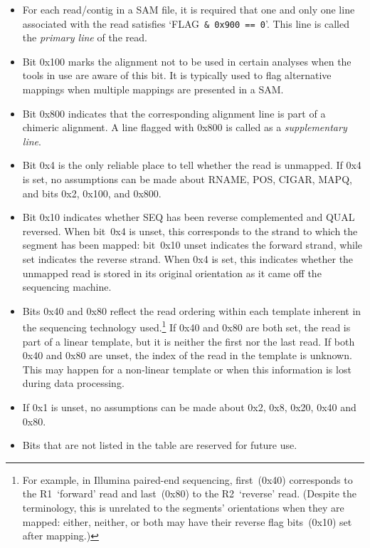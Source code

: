 \documentclass[10pt]{article}
\begin{document}
\begin{enumerate}
\begin{center}
  \end{center}
  \begin{itemize}
  \item For each read/contig in a SAM file, it is required that one and only
	one line associated with the read satisfies \mbox{`{\sf FLAG} {\tt \& 0x900
	== 0}'}. This line is called the \emph{primary line} of the read.
  \item Bit 0x100 marks the alignment not to be used in certain analyses
    when the tools in use are aware of this bit. It is typically used to
	flag alternative mappings when multiple mappings are presented in a SAM.
  \item Bit 0x800 indicates that the corresponding alignment line is part of
    a chimeric alignment. A line flagged with 0x800 is called as a \emph{supplementary line}.
  \item Bit 0x4 is the only reliable place to tell whether the read
    is unmapped. If 0x4 is set, no assumptions can be made about {\sf
      RNAME}, {\sf POS}, {\sf CIGAR}, {\sf MAPQ}, and bits 0x2, 0x100,
    and 0x800.
  \item Bit 0x10 indicates whether {\sf SEQ} has been reverse complemented
    and {\sf QUAL} reversed.
    When bit~0x4 is unset, this corresponds to the strand to which the
    segment has been mapped: bit~0x10 unset indicates the forward strand,
    while set indicates the reverse strand.
    When 0x4 is set, this indicates whether the unmapped read is stored
    in its original orientation as it came off the sequencing machine.
  \item Bits 0x40 and 0x80 reflect the read ordering within each template
    inherent in the sequencing technology used.\footnote{For example,
    in Illumina paired-end sequencing, {\sf first}~(0x40) corresponds to
    the R1~`forward' read and {\sf last}~(0x80) to the R2~`reverse' read.
    (Despite the terminology, this is unrelated to the segments' orientations
    when they are mapped: either, neither, or both may have their
    {\sf reverse} flag bits~(0x10) set after mapping.)}
    If 0x40 and 0x80 are both set, the read is part of a linear
    template, but it is neither the first nor the last read. If both
    0x40 and 0x80 are unset, the index of the read in the template
    is unknown. This may happen for a non-linear template or when this
    information is lost during data processing.
  \item If 0x1 is unset, no assumptions can be made about 0x2, 0x8,
    0x20, 0x40 and 0x80.
  \item Bits that are not listed in the table are reserved for future use.

\end{itemize}
\end{enumerate}
\end{document}
